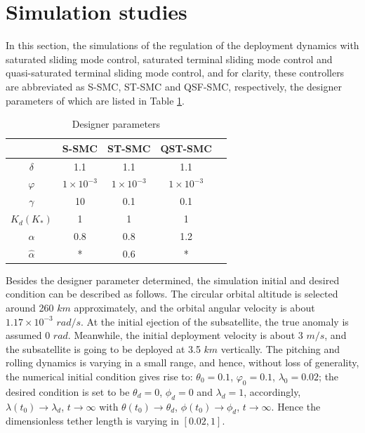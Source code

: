 \documentclass[Journal,letterpaper]{ascelike-new}
\theoremstyle{plain}
\theoremstyle{remark}
\begin{document}
\section{Simulation studies}\label{sec:4}
In this section, the simulations of the regulation of the deployment dynamics with saturated sliding mode control, saturated terminal sliding mode control and quasi-saturated terminal sliding mode control, and for clarity, these controllers are abbreviated as S-SMC, ST-SMC and QSF-SMC, respectively, the designer parameters of which are listed in Table \ref{tab:1}.\par
\begin{table}[!hbp]
\caption{Designer parameters}\label{tab:1}
\begin{center}
\begin{tabular}{ccccc}
\hline
 &S-SMC &ST-SMC &QST-SMC \\
\hline
$\delta$    & 1.1   & 1.1   & 1.1  \\
$\varphi$  & $1\times 10^{-3}$ & $1\times 10^{-3}$& $1\times 10^{-3}$ \\
$\gamma$    & 10    & 0.1     & 0.1     \\
$K_d(K_{*})$       & 1     & 1     & 1   \\
$\alpha$    & 0.8     & 0.8     & 1.2   \\
$\hat\alpha$ & *    & 0.6   & *      \\
\hline
\end{tabular}
\end{center}
\end{table}
Besides the designer parameter determined, the simulation initial and desired condition can be described as follows. The circular orbital altitude is selected around 260 $km$ approximately, and the orbital angular velocity is about $1.17\times 10^{-3}$ $rad/s$. At the initial ejection of the subsatellite, the true anomaly is assumed 0 $rad$. Meanwhile, the initial deployment velocity is about 3 $m/s$, and the subsatellite is going to be deployed at 3.5 $km$ vertically. The pitching and rolling dynamics is varying in a small range, and hence, without loss of generality, the numerical initial condition gives rise to: $\theta_0 = 0.1$, $\varphi_0 = 0.1$, $\lambda_0 = 0.02$; the desired condition is set to be $\theta_d = 0$, $\phi_d = 0$ and $\lambda_d = 1$, accordingly, $\lambda(t_0)\rightarrow\lambda_d$, $t\rightarrow\infty$ with $\theta(t_0)\rightarrow\theta_d$, $\phi(t_0)\rightarrow\phi_d$, $t\rightarrow\infty$. Hence the dimensionless tether length is varying in $[0.02,1]$.\par
\end{document}
